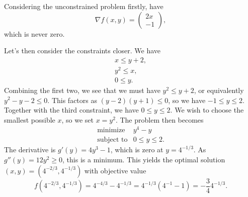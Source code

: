 \begin{solution}
  Considering the unconstrained problem firstly, have
  \begin{equation}
    \nabla f(x, y) =
    \begin{pmatrix}
      2x \\
      -1
    \end{pmatrix},
  \end{equation}
  which is never zero.

  Let's then consider the constraints closer.
  We have
  \begin{equation}
    \begin{split}
      x \leq y + 2, \\
      y^2 \leq x, \\
      0 \leq y.
    \end{split}
  \end{equation}
  Combining the first two, we see that we must have $y^2 \leq y + 2$, or equivalently $y^2 - y - 2 \leq 0$.
  This factors as $(y - 2)(y + 1) \leq 0$, so we have $-1 \leq y \leq 2$.
  Together with the third constraint, we have $0 \leq y \leq 2$.
  We wish to choose the smallest possible $x$, so we set $x = y^2$.
  The problem then becomes
  \begin{equation}
    \begin{array}{rrl}
      \text{minimize} & y^4 - y \\
      \text{subject to} & 0 \leq y \leq 2.
    \end{array}
  \end{equation}
  The derivative is $g'(y) = 4y^3 - 1$, which is zero at $y = 4^{-1/3}$.
  As $g''(y) = 12 y^2 \geq 0$, this is a minimum.
  This yields the optimal solution $(x, y) = (4^{-2/3}, 4^{-1/3})$ with objective value
  \begin{equation}
    f(4^{-2/3}, 4^{-1/3})
    = 4^{-4/3} - 4^{-1/3}
    = 4^{-1/3} (4^{-1} - 1)
    = -\frac{3}{4} 4^{-1/3}.
  \end{equation}
\end{solution}
